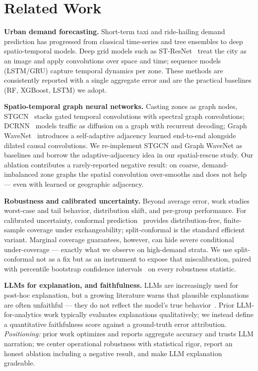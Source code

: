 \documentclass[sigconf, review, nonacm]{acmart}
\begin{document}
\section{Related Work}
\textbf{Urban demand forecasting.} Short-term taxi and ride-hailing demand prediction has progressed
from classical time-series and tree ensembles to deep spatio-temporal models. Deep grid models such as
ST-ResNet~\cite{zhang2017stresnet} treat the city as an image and apply convolutions over space and
time; sequence models (LSTM/GRU) capture temporal dynamics per zone. These methods are consistently
reported with a single aggregate error and are the practical baselines (RF, XGBoost, LSTM) we adopt.

\textbf{Spatio-temporal graph neural networks.} Casting zones as graph nodes, STGCN~\cite{yu2018stgcn}
stacks gated temporal convolutions with spectral graph convolutions; DCRNN~\cite{li2018dcrnn} models
traffic as diffusion on a graph with recurrent decoding; Graph WaveNet~\cite{wu2019graphwavenet}
introduces a self-adaptive adjacency learned end-to-end alongside dilated causal convolutions. We
re-implement STGCN and Graph WaveNet as baselines and borrow the adaptive-adjacency idea in our
spatial-rescue study. Our ablation contributes a rarely-reported negative result: on coarse,
demand-imbalanced zone graphs the spatial convolution over-smooths and does not help --- even with
learned or geographic adjacency.

\textbf{Robustness and calibrated uncertainty.} Beyond average error, work studies worst-case and tail
behavior, distribution shift, and per-group performance. For calibrated uncertainty, conformal
prediction~\cite{vovk2005conformal,shafer2008conformal} provides distribution-free, finite-sample
coverage under exchangeability; split-conformal is the standard efficient variant. Marginal coverage
guarantees, however, can hide severe conditional under-coverage --- exactly what we observe on
high-demand strata. We use split-conformal not as a fix but as an instrument to expose that
miscalibration, paired with percentile bootstrap confidence intervals~\cite{efron1993bootstrap} on
every robustness statistic.

\textbf{LLMs for explanation, and faithfulness.} LLMs are increasingly used for post-hoc explanation,
but a growing literature warns that plausible explanations are often unfaithful --- they do not reflect
the model's true behavior~\cite{jacovi2020faithfulness}. Prior LLM-for-analytics work typically
evaluates explanations qualitatively; we instead define a quantitative faithfulness score against a
ground-truth error attribution. \emph{Positioning:} prior work optimizes and reports aggregate accuracy
and trusts LLM narration; we center operational robustness with statistical rigor, report an honest
ablation including a negative result, and make LLM explanation gradeable.
\end{document}
